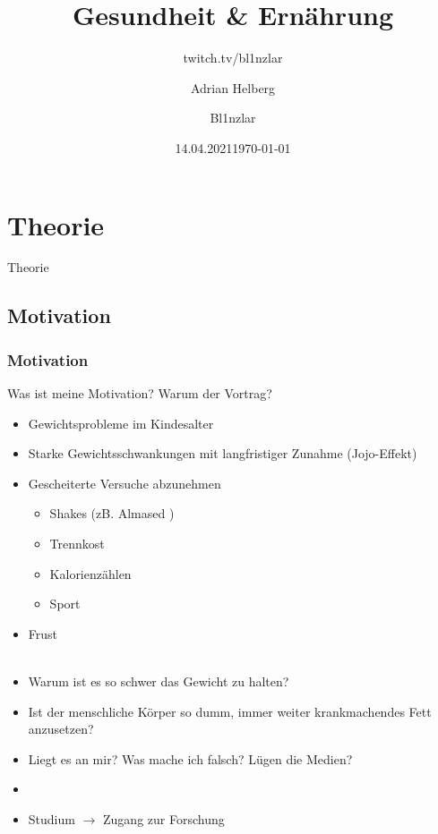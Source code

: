 \documentclass[xcolor=dvipsnames]{beamer}
\title{Gesundheit \& Ernährung}
\author{Adrian Helberg}
\date{14.04.2021}
\subtitle{twitch.tv/bl1nzlar}
\author{Bl1nzlar}
\date{\today}
\begin{document}
    \maketitle


    \section{Theorie}
    {
    \begin{frame}
        \begin{center}
            \Huge Theorie
        \end{center}
    \end{frame}
    }

    \subsection{Motivation}
    \begin{frame}[allowframebreaks]
        \frametitle{Motivation}
        \begin{block}{Was ist meine Motivation? Warum der Vortrag?}
            ~
            \begin{itemize}
                \setlength\itemsep{1em}
                \item Gewichtsprobleme im Kindesalter
                \item Starke Gewichtsschwankungen mit langfristiger Zunahme (Jojo-Effekt)
                \item Gescheiterte Versuche abzunehmen
                \begin{itemize}
                    \setlength\itemsep{0.6em}
                    \item Shakes (zB. Almased \textregistered)
                    \item Trennkost
                    \item Kalorienzählen
                    \item Sport
                \end{itemize}
                \item Frust\\~
            \end{itemize}
        \end{block}

        \framebreak

        \begin{itemize}
            \setlength\itemsep{1em}
            \item Warum ist es so schwer das Gewicht zu halten?
            \item Ist der menschliche Körper so dumm, immer weiter krankmachendes Fett anzusetzen?
            \item Liegt es an mir? Was mache ich falsch? Lügen die Medien?
            \item[]
            \item Studium $\rightarrow$ Zugang zur Forschung
        \end{itemize}
    \end{frame}
\end{document}
